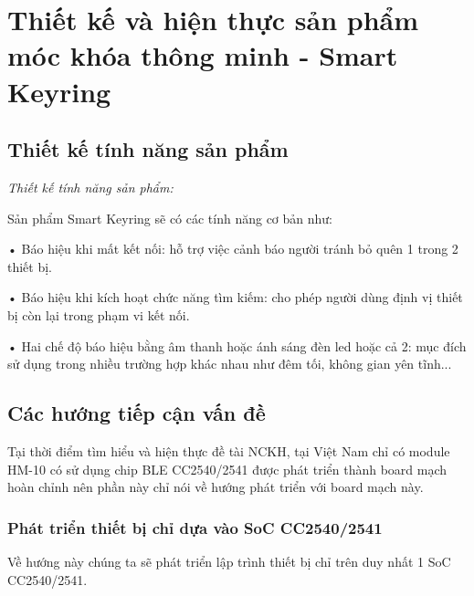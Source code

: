 
\chapter{Thiết kế và hiện thực \newline sản phẩm móc khóa thông minh - Smart Keyring}

\ifpdf
    \graphicspath{{Chapter2/Figs/Raster/}{Chapter2/Figs/PDF/}{Chapter2/Figs/}}
\else
    \graphicspath{{Chapter2/Figs/Vector/}{Chapter2/Figs/}}
\fi


\section{Thiết kế tính năng sản phẩm}
\textit{Thiết kế tính năng sản phẩm:}

\label{feature}
Sản phẩm Smart Keyring sẽ có các tính năng cơ bản như:

• Báo hiệu khi mất kết nối: hỗ trợ việc cảnh báo người tránh bỏ quên 1 trong 2 thiết bị.

• Báo hiệu khi kích hoạt chức năng tìm kiếm: cho phép người dùng định vị thiết bị còn lại trong phạm vi kết nối.

• Hai chế độ báo hiệu bằng âm thanh hoặc ánh sáng đèn led hoặc cả 2: mục đích sử dụng trong nhiều trường hợp khác nhau như đêm tối, không gian yên tĩnh...
\section{Các hướng tiếp cận vấn đề}

Tại thời điểm tìm hiểu và hiện thực đề tài NCKH, tại Việt Nam chỉ có module HM-10 có sử dụng chip BLE CC2540/2541 được phát triển thành board mạch hoàn chỉnh nên phần này chỉ nói về hướng phát triển với board mạch này.

\subsection{Phát triển thiết bị chỉ dựa vào SoC CC2540/2541}
\label{dev}
Về hướng này chúng ta sẽ phát triển lập trình thiết bị chỉ trên duy nhất 1 SoC CC2540/2541.

